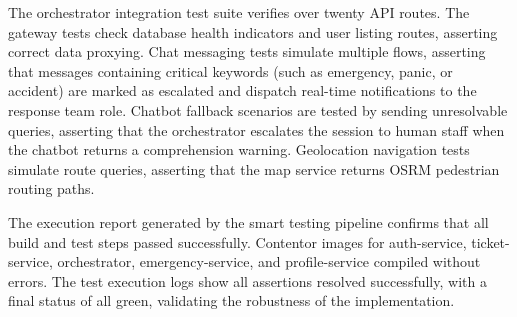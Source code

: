 \documentclass[12pt]{article}
\begin{document}
The orchestrator integration test suite verifies over twenty API routes. The gateway tests check database health indicators and user listing routes, asserting correct data proxying. Chat messaging tests simulate multiple flows, asserting that messages containing critical keywords (such as emergency, panic, or accident) are marked as escalated and dispatch real-time notifications to the response team role. Chatbot fallback scenarios are tested by sending unresolvable queries, asserting that the orchestrator escalates the session to human staff when the chatbot returns a comprehension warning. Geolocation navigation tests simulate route queries, asserting that the map service returns OSRM pedestrian routing paths.

The execution report generated by the smart testing pipeline confirms that all build and test steps passed successfully. Contentor images for auth-service, ticket-service, orchestrator, emergency-service, and profile-service compiled without errors. The test execution logs show all assertions resolved successfully, with a final status of all green, validating the robustness of the implementation.
\end{document}
